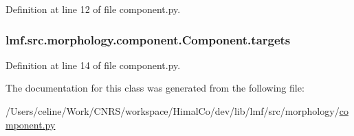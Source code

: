 Definition at line 12 of file component.\+py.

\hypertarget{classlmf_1_1src_1_1morphology_1_1component_1_1_component_a90de1db1e2438bbbcd08cccbe07ad1ea}{
\subsubsection[{targets}]{\setlength{\rightskip}{0pt plus 5cm}lmf.\+src.\+morphology.\+component.\+Component.\+targets}}\label{classlmf_1_1src_1_1morphology_1_1component_1_1_component_a90de1db1e2438bbbcd08cccbe07ad1ea}


Definition at line 14 of file component.\+py.



The documentation for this class was generated from the following file\+:\begin{DoxyCompactItemize}
\item 
/\+Users/celine/\+Work/\+C\+N\+R\+S/workspace/\+Himal\+Co/dev/lib/lmf/src/morphology/\hyperlink{component_8py}{component.\+py}\end{DoxyCompactItemize}
